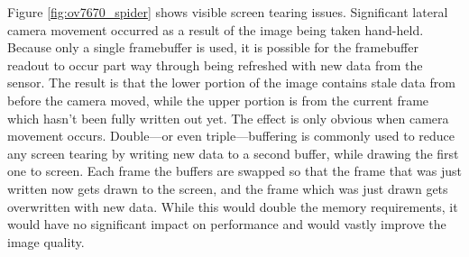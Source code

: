 Figure \ref{fig:ov7670_spider} shows visible screen tearing issues. Significant lateral camera movement occurred as a result of the image being taken hand-held. Because only a single framebuffer is used, it is possible for the framebuffer readout to occur part way through being refreshed with new data from the sensor. The result is that the lower portion of the image contains stale data from before the camera moved, while the upper portion is from the current frame which hasn't been fully written out yet. The effect is only obvious when camera movement occurs. Double---or even triple---buffering is commonly used to reduce any screen tearing by writing new data to a second buffer, while drawing the first one to screen. Each frame the buffers are swapped so that the frame that was just written now gets drawn to the screen, and the frame which was just drawn gets overwritten with new data. While this would double the memory requirements, it would have no significant impact on performance and would vastly improve the image quality.

